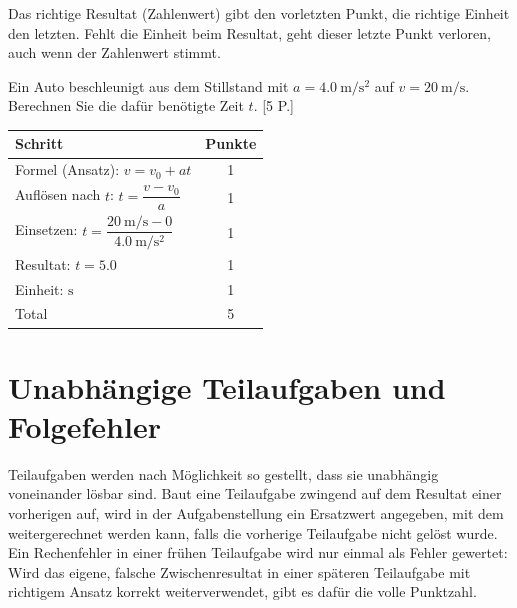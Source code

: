 \documentclass[11pt,a4paper]{article}
\begin{document}
Das richtige Resultat (Zahlenwert) gibt den vorletzten Punkt, die
richtige Einheit den letzten. Fehlt die Einheit beim Resultat, geht
dieser letzte Punkt verloren, auch wenn der Zahlenwert stimmt.

\begin{beispielbox}
Ein Auto beschleunigt aus dem Stillstand mit
$a = \SI{4.0}{\meter\per\second\squared}$ auf $v = \SI{20}{\meter\per\second}$.
Berechnen Sie die dafür benötigte Zeit $t$. [5 P.]

\begin{tabularx}{\textwidth}{@{}X c@{}}
\toprule
Schritt & Punkte \\
\midrule
Formel (Ansatz): $v = v_0 + a t$ & 1 \\
Auflösen nach $t$: $t = \dfrac{v - v_0}{a}$ & 1 \\
Einsetzen: $t = \dfrac{\SI{20}{\meter\per\second} - 0}{\SI{4.0}{\meter\per\second\squared}}$ & 1 \\
Resultat: $t = 5.0$ & 1 \\
Einheit: $\si{\second}$ & 1 \\
\midrule
Total & 5 \\
\bottomrule
\end{tabularx}
\end{beispielbox}

\section*{Unabhängige Teilaufgaben und Folgefehler}

Teilaufgaben werden nach Möglichkeit so gestellt, dass sie unabhängig
voneinander lösbar sind. Baut eine Teilaufgabe zwingend auf dem Resultat
einer vorherigen auf, wird in der Aufgabenstellung ein Ersatzwert
angegeben, mit dem weitergerechnet werden kann, falls die vorherige
Teilaufgabe nicht gelöst wurde. Ein Rechenfehler in einer frühen
Teilaufgabe wird nur einmal als Fehler gewertet: Wird das eigene, falsche
Zwischenresultat in einer späteren Teilaufgabe mit richtigem Ansatz
korrekt weiterverwendet, gibt es dafür die volle Punktzahl.
\end{document}
